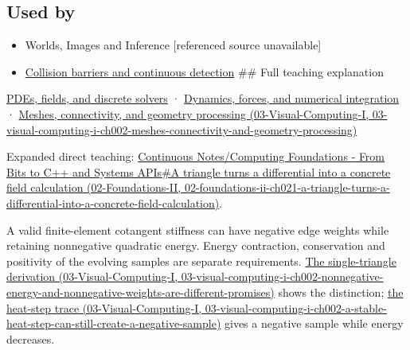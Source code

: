 \subsection{Used by}\label{appendix-1988d465c119-used-by}

\begin{itemize}
\item
  {Worlds, Images and Inference {[}referenced source unavailable{]}}
\item
  \hyperref[appendix-a9ba01fa72a6]{Collision barriers and continuous detection} \#\# Full teaching explanation
\end{itemize}

\hyperref[04-visual-computing-ii-ch030-pdes-fields-and-discrete-solvers]{PDEs, fields, and discrete solvers} · \hyperref[04-visual-computing-ii-ch029-dynamics-forces-and-numerical-integration]{Dynamics, forces, and numerical integration} · \href{../03-Visual-Computing-I/main.pdf\#nameddest=03-visual-computing-i-ch002-meshes-connectivity-and-geometry-processing}{Meshes, connectivity, and geometry processing (03-Visual-Computing-I, 03-visual-computing-i-ch002-meshes-connectivity-and-geometry-processing)}

Expanded direct teaching: \href{../02-Foundations-II/main.pdf\#nameddest=02-foundations-ii-ch021-a-triangle-turns-a-differential-into-a-concrete-field-calculation}{Continuous Notes/Computing Foundations - From Bits to C++ and Systems APIs\#A triangle turns a differential into a concrete field calculation (02-Foundations-II, 02-foundations-ii-ch021-a-triangle-turns-a-differential-into-a-concrete-field-calculation)}.

A valid finite-element cotangent stiffness can have negative edge weights while retaining nonnegative quadratic energy. Energy contraction, conservation and positivity of the evolving samples are separate requirements. \href{../03-Visual-Computing-I/main.pdf\#nameddest=03-visual-computing-i-ch002-nonnegative-energy-and-nonnegative-weights-are-different-promises}{The single-triangle derivation (03-Visual-Computing-I, 03-visual-computing-i-ch002-nonnegative-energy-and-nonnegative-weights-are-different-promises)} shows the distinction; \href{../03-Visual-Computing-I/main.pdf\#nameddest=03-visual-computing-i-ch002-a-stable-heat-step-can-still-create-a-negative-sample}{the heat-step trace (03-Visual-Computing-I, 03-visual-computing-i-ch002-a-stable-heat-step-can-still-create-a-negative-sample)} gives a negative sample while energy decreases.
